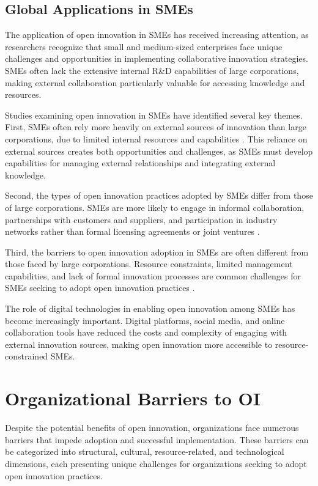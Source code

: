 \documentclass[12pt,a4paper]{article}
\begin{document}
\subsection{Global Applications in SMEs}

The application of open innovation in SMEs has received increasing attention, as researchers recognize that small and medium-sized enterprises face unique challenges and opportunities in implementing collaborative innovation strategies. SMEs often lack the extensive internal R\&D capabilities of large corporations, making external collaboration particularly valuable for accessing knowledge and resources.

Studies examining open innovation in SMEs have identified several key themes. First, SMEs often rely more heavily on external sources of innovation than large corporations, due to limited internal resources and capabilities \cite{van2011open}. This reliance on external sources creates both opportunities and challenges, as SMEs must develop capabilities for managing external relationships and integrating external knowledge.

Second, the types of open innovation practices adopted by SMEs differ from those of large corporations. SMEs are more likely to engage in informal collaboration, partnerships with customers and suppliers, and participation in industry networks rather than formal licensing agreements or joint ventures \cite{lee2010open}.

Third, the barriers to open innovation adoption in SMEs are often different from those faced by large corporations. Resource constraints, limited management capabilities, and lack of formal innovation processes are common challenges for SMEs seeking to adopt open innovation practices \cite{spithoven2013open}.

The role of digital technologies in enabling open innovation among SMEs has become increasingly important. Digital platforms, social media, and online collaboration tools have reduced the costs and complexity of engaging with external innovation sources, making open innovation more accessible to resource-constrained SMEs.

\section{Organizational Barriers to OI}

Despite the potential benefits of open innovation, organizations face numerous barriers that impede adoption and successful implementation. These barriers can be categorized into structural, cultural, resource-related, and technological dimensions, each presenting unique challenges for organizations seeking to adopt open innovation practices.
\end{document}
